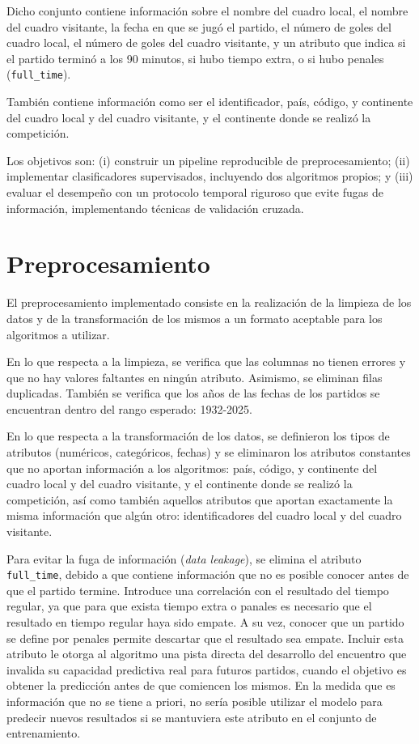 \documentclass[conference]{IEEEtran}
\begin{document}
Dicho conjunto contiene información sobre el nombre del cuadro local, el nombre del cuadro visitante, la fecha en que se jugó el partido, el número de goles del cuadro local, el número de goles del cuadro visitante, y un atributo que indica si el partido terminó a los 90 minutos, si hubo tiempo extra, o si hubo penales (\texttt{full\_time}).

También contiene información como ser el identificador, país, código, y continente del cuadro local y del cuadro visitante, y el continente donde se realizó la competición. 

Los objetivos son: (i) construir un pipeline reproducible de preprocesamiento;
(ii) implementar clasificadores supervisados, incluyendo dos algoritmos propios;
y (iii) evaluar el desempeño con un protocolo temporal riguroso que evite fugas de información, implementando técnicas de validación cruzada. 

\section{Preprocesamiento}

El preprocesamiento implementado consiste en la realización de la limpieza de los datos y de la transformación de los mismos a un formato aceptable para los algoritmos a utilizar.

En lo que respecta a la limpieza, se verifica que las columnas no tienen errores y que no hay valores faltantes en ningún atributo. Asimismo, se eliminan filas duplicadas. También se verifica que los años de las fechas de los partidos se encuentran dentro del rango esperado: 1932-2025.

En lo que respecta a la transformación de los datos, se definieron los tipos de atributos (numéricos, categóricos, fechas) y se eliminaron los atributos constantes que no aportan información a los algoritmos: país, código, y continente del cuadro local y del cuadro visitante, y el continente donde se realizó la competición, así como también aquellos atributos que aportan exactamente la misma información que algún otro: identificadores del cuadro local y del cuadro visitante.

Para evitar la fuga de información (\textit{data leakage}), se elimina el atributo \texttt{full\_time}, debido a que contiene información que no es posible conocer antes de que el partido termine. Introduce una correlación con el resultado del tiempo regular, ya que para que exista tiempo extra o panales es necesario que el resultado en tiempo regular haya sido empate. A su vez, conocer que un partido se define por penales permite descartar que el resultado sea empate. Incluir esta atributo le otorga al algoritmo una pista directa del desarrollo del encuentro que invalida su capacidad predictiva real para futuros partidos, cuando el objetivo es obtener la predicción antes de que comiencen los mismos. En la medida que es información que no se tiene a priori, no sería posible utilizar el modelo para predecir nuevos resultados si se mantuviera este atributo en el conjunto de entrenamiento.
\end{document}
